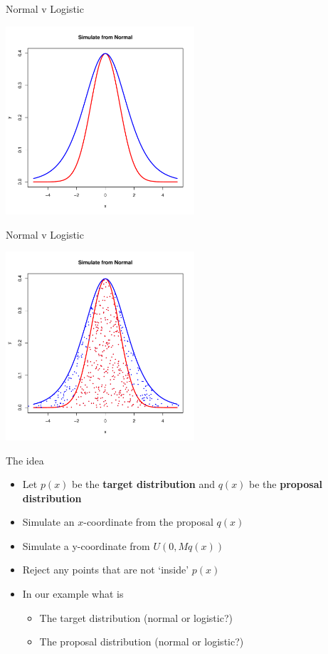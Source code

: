 \documentclass
[handout]
{beamer}
\begin{document}
\begin{frame}{Normal v Logistic}
\begin{center}
\includegraphics[height=7cm]{./Pics/nmlg2.pdf}
\end{center}
\end{frame}
\begin{frame}{Normal v Logistic}
\begin{center}
\includegraphics[height=7cm]{./Pics/nmlg3.pdf}
\end{center}
\end{frame}
\begin{frame}{The idea}
\begin{itemize}
\item Let $p(x)$ be the {\bf target distribution} and $q(x)$ be the {\bf proposal distribution}
\pause
\item Simulate an $x$-coordinate from the proposal $q(x)$
\pause
\item Simulate a y-coordinate from $U(0,Mq(x))$
\pause
\item Reject any points that are not `inside' $p(x)$
\pause
\item In our example what is
\begin{itemize}
\item The target distribution (normal or logistic?)
\item The proposal distribution (normal or logistic?)
\end{itemize}
\end{itemize}
\end{frame}
\end{document}
